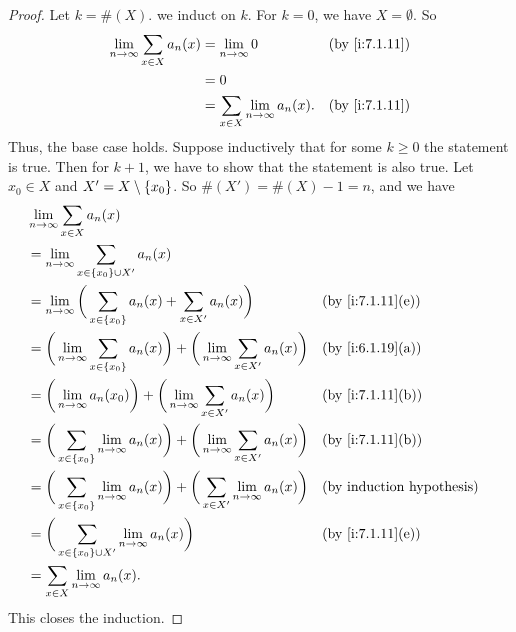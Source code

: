 \begin{proof}
  Let \(k = \#(X)\).
  we induct on \(k\).
  For \(k = 0\), we have \(X = \emptyset\).
  So
  \begin{align*}
    \lim_{n \to \infty} \sum_{x \in X} a_n(x) & = \lim_{n \to \infty} 0                      &  & \by{i:7.1.11} \\
                                              & = 0                                                             \\
                                              & = \sum_{x \in X} \lim_{n \to \infty} a_n(x). &  & \by{i:7.1.11}
  \end{align*}
  Thus, the base case holds.
  Suppose inductively that for some \(k \geq 0\) the statement is true.
  Then for \(k + 1\), we have to show that the statement is also true.
  Let \(x_0 \in X\) and \(X' = X \setminus \left\lbrace x_0\right\rbrace\).
  So \(\#(X') = \#(X) - 1 = n\), and we have
  \begin{align*}
     & \lim_{n \to \infty} \sum_{x \in X} a_n(x)                                                                                                      \\
     & = \lim_{n \to \infty} \sum_{x \in \set{x_0} \cup X'} a_n(x)                                                                                    \\
     & = \lim_{n \to \infty} \bigg(\sum_{x \in \set{x_0}} a_n(x) + \sum_{x \in X'} a_n(x)\bigg)                                 &  & \by{i:7.1.11}[e] \\
     & = \bigg(\lim_{n \to \infty} \sum_{x \in \set{x_0}} a_n(x)\bigg) + \bigg(\lim_{n \to \infty} \sum_{x \in X'} a_n(x)\bigg) &  & \by{i:6.1.19}[a] \\
     & = \bigg(\lim_{n \to \infty} a_n(x_0)\bigg) + \bigg(\lim_{n \to \infty} \sum_{x \in X'} a_n(x)\bigg)                      &  & \by{i:7.1.11}[b] \\
     & = \bigg(\sum_{x \in \set{x_0}} \lim_{n \to \infty} a_n(x)\bigg) + \bigg(\lim_{n \to \infty} \sum_{x \in X'} a_n(x)\bigg) &  & \by{i:7.1.11}[b] \\
     & = \bigg(\sum_{x \in \set{x_0}} \lim_{n \to \infty} a_n(x)\bigg) + \bigg(\sum_{x \in X'} \lim_{n \to \infty} a_n(x)\bigg) &  & \byIH            \\
     & = \bigg(\sum_{x \in \set{x_0} \cup X'} \lim_{n \to \infty} a_n(x)\bigg)                                                  &  & \by{i:7.1.11}[e] \\
     & = \sum_{x \in X} \lim_{n \to \infty} a_n(x).
  \end{align*}
  This closes the induction.
\end{proof}
